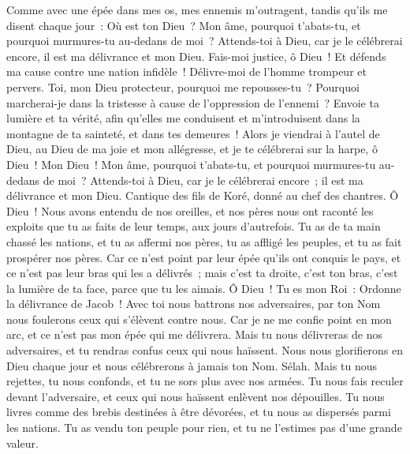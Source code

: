 \begin{multicols}{2}
Comme avec une épée dans mes os, mes ennemis m'outragent, tandis qu'ils me disent chaque jour~: Où est ton Dieu~?
Mon âme, pourquoi t'abats-tu, et pourquoi murmures-tu au-dedans de moi~? Attends-toi à Dieu, car je le célébrerai encore, il est ma délivrance et mon Dieu.
\VerseOne{}Fais-moi justice, ô Dieu~! Et défends ma cause contre une nation infidèle~! Délivre-moi de l'homme trompeur et pervers.
Toi, mon Dieu protecteur, pourquoi me repousses-tu~? Pourquoi marcherai-je dans la tristesse à cause de l'oppression de l'ennemi~?
Envoie ta lumière et ta vérité, afin qu'elles me conduisent et m'introduisent dans la montagne de ta sainteté, et dans tes demeures~!
Alors je viendrai à l'autel de Dieu, au Dieu de ma joie et mon allégresse, et je te célébrerai sur la harpe, ô Dieu~! Mon Dieu~!
Mon âme, pourquoi t'abats-tu, et pourquoi murmures-tu au-dedans de moi~? Attends-toi à Dieu, car je le célébrerai encore~; il est ma délivrance et mon Dieu.
\VerseOne{}Cantique des fils de Koré, donné au chef des chantres.
Ô Dieu~! Nous avons entendu de nos oreilles, et nos pères nous ont raconté les exploits que tu as faits de leur temps, aux jours d'autrefois.
Tu as de ta main chassé les nations, et tu as affermi nos pères, tu as affligé les peuples, et tu as fait prospérer nos pères.
Car ce n'est point par leur épée qu'ils ont conquis le pays, et ce n'est pas leur bras qui les a délivrés~; mais c'est ta droite, c'est ton bras, c'est la lumière de ta face, parce que tu les aimais.
Ô Dieu~! Tu es mon Roi~: Ordonne la délivrance de Jacob~!
Avec toi nous battrons nos adversaires, par ton Nom nous foulerons ceux qui s'élèvent contre nous.
Car je ne me confie point en mon arc, et ce n'est pas mon épée qui me délivrera.
Mais tu nous délivreras de nos adversaires, et tu rendras confus ceux qui nous haïssent.
Nous nous glorifierons en Dieu chaque jour et nous célébrerons à jamais ton Nom. Sélah.
Mais tu nous rejettes, tu nous confonds, et tu ne sors plus avec nos armées.
Tu nous fais reculer devant l'adversaire, et ceux qui nous haïssent enlèvent nos dépouilles.
Tu nous livres comme des brebis destinées à être dévorées, et tu nous as dispersés parmi les nations.
Tu as vendu ton peuple pour rien, et tu ne l'estimes pas d'une grande valeur.

\end{multicols}
